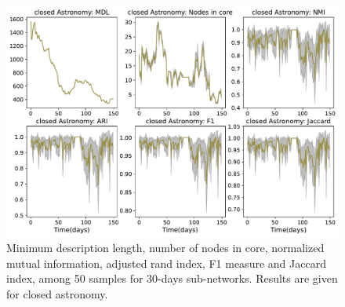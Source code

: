 \begin{figure}[h]
	\centering
	\includegraphics[width=\linewidth]{figures/stackexchange/blockmodel_robust.pdf}
	\caption{Minimum description length, number of nodes in core, normalized mutual information, adjusted rand index, F1 measure and Jaccard index, among 50 samples for 30-days sub-networks. Results are given for closed astronomy. }
	\label{fig:sample}
\end{figure}
